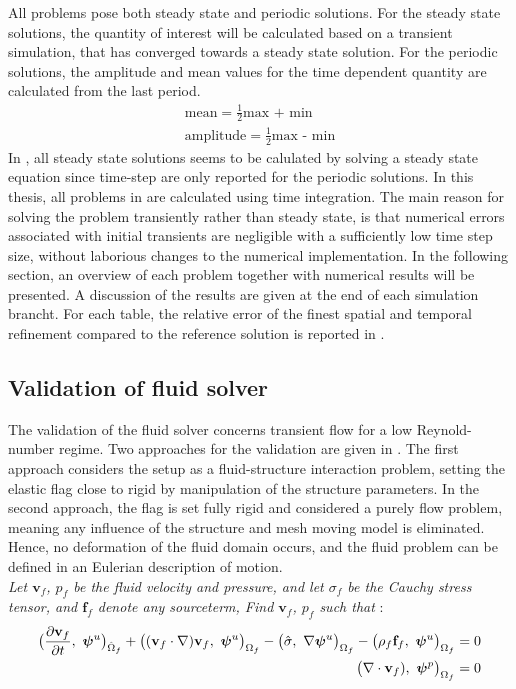 \newpage
All problems pose both steady state and periodic solutions. For the steady state solutions, the quantity of interest will be calculated based on a transient simulation, that has converged towards a steady state solution. For the periodic solutions, the amplitude and mean values for the time dependent quantity are calculated from the last period.
\begin{align}
\text{mean} = \frac{1}{2} \text{max + min} \\
\text{amplitude} = \frac{1}{2} \text{max - min}
\label{icond}
\end{align}
 In \cite{Hron2006}, all steady state solutions seems to be calulated by solving a steady state equation since time-step are only reported for the periodic solutions. In this thesis, all problems in \cite{Hron2006} are calculated using time integration. The main reason for solving the problem transiently rather than steady state, is that numerical errors associated with initial transients are negligible with a sufficiently low time step size, without laborious changes to the numerical implementation. In the following section, an overview of each problem together with numerical results will be presented. A  discussion of the results are given at the end of each simulation brancht. For each table, the relative error of the finest spatial and temporal refinement compared to the reference solution is reported in \cite{Hron2006}.

\subsection{Validation of fluid solver}
The validation of the fluid solver concerns transient flow for a low Reynold-number regime. Two approaches for the validation are given in \cite{Hron2006}. The first approach considers the setup as a fluid-structure interaction problem, setting the elastic flag close to rigid by manipulation of the structure parameters. In the second approach, the flag is set fully rigid and considered a purely flow problem, meaning any influence of the structure and mesh moving model is eliminated.  Hence, no deformation of the fluid domain occurs, and the fluid problem can be defined in an Eulerian description of motion.  \\

\textit{Let $\mathbf{v}_f$, ${p}_f$ be the fluid velocity and pressure, and let  $\sigma_f$ be the Cauchy stress tensor, and $\mathbf{f}_f$ denote any sourceterm,  Find $\mathbf{v}_f$, ${p}_f$ such that }:
\begin{align*}
 \big( \frac{\partial \mathbf{v}_f}{\partial t}, \ \bm{\psi}^u \big)_{\hat{\Omega}_f} +
\big((\mathbf{v}_f \cdot \nabla) \mathbf{v}_f, \ {\bm{\psi}^u} \big)_{\Omega_f}
- \big(\hat{\sigma}, \ {\nabla\bm{\psi}^u} \big)_{\Omega_f} -
\big(\rho_f  \mathbf{f}_f, \ {{\bm{\psi}^u}} \big)_{\Omega_f} = 0 \\
\big(\nabla \cdot \mathbf{v}_f), \ {\bm{\psi}^p} \big)_{\Omega_f} = 0 
\end{align*} 


